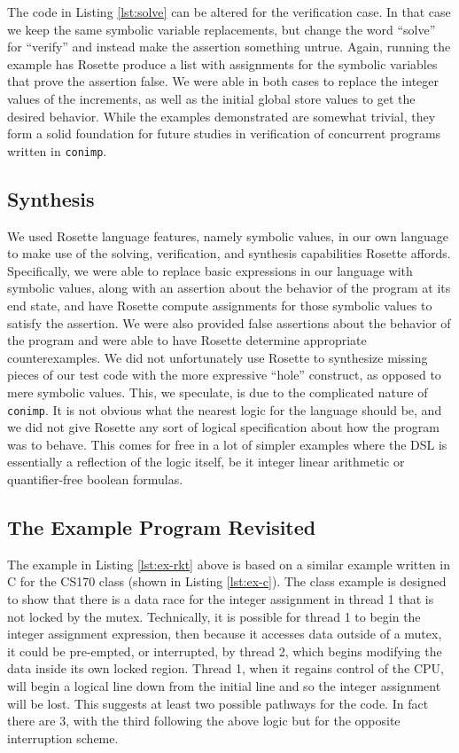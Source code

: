 The code in Listing \ref{lst:solve} can be altered for the verification case.  In that case we keep the same symbolic variable replacements, but change the word ``solve'' for ``verify'' and instead make the assertion something untrue.  Again, running the example has Rosette produce a list with assignments for the symbolic variables that prove the assertion false.  We were able in both cases to replace the integer values of the increments, as well as the initial global store values to get the desired behavior.  While the examples demonstrated are somewhat trivial, they form a solid foundation for future studies in verification of concurrent programs written in \texttt{conimp}.  

\subsection{Synthesis}
We used Rosette language features, namely symbolic values, in our own language to make use of the solving, verification, and synthesis capabilities Rosette affords.  Specifically, we were able to replace basic expressions in our language with symbolic values, along with an assertion about the behavior of the program at its end state, and have Rosette compute assignments for those symbolic values to satisfy the assertion.  We were also provided false assertions about the behavior of the program and were able to have Rosette determine appropriate counterexamples.  We did not unfortunately use Rosette to synthesize missing pieces of our test code with the more expressive ``hole'' construct, as opposed to mere symbolic values.  This, we speculate, is due to the complicated nature of \texttt{conimp}.  It is not obvious what the nearest logic for the language should be, and we did not give Rosette any sort of logical specification about how the program was to behave.  This comes for free in a lot of simpler examples where the DSL is essentially a reflection of the logic itself, be it integer linear arithmetic or quantifier-free boolean formulas.  

\subsection{The Example Program Revisited}
The example in Listing \ref{lst:ex-rkt} above is based on a similar example written in C for the CS170 class (shown in Listing \ref{lst:ex-c}).  The class example is designed to show that there is a data race for the integer assignment in thread 1 that is not locked by the mutex.  Technically, it is possible for thread 1 to begin the integer assignment expression, then because it accesses data outside of a mutex, it could be pre-empted, or interrupted, by thread 2, which begins modifying the data inside its own locked region.  Thread 1, when it regains control of the CPU, will begin a logical line down from the initial line and so the integer assignment will be lost.  This suggests at least two possible pathways for the code.  In fact there are 3, with the third following the above logic but for the opposite interruption scheme.

